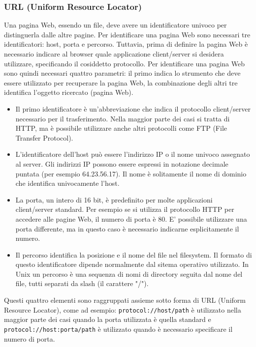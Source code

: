 \subsubsection*{URL (Uniform Resource Locator)}
Una pagina Web, essendo un file, deve avere un identificatore univoco per distinguerla dalle altre pagine. Per identificare una pagina Web sono necessari tre identificatori: host, porta e percorso. Tuttavia, prima di definire la pagina Web è necessario indicare al browser quale applicazione client/server si desidera utilizzare, specificando il cosiddetto protocollo. Per identificare una pagina Web sono quindi necessari quattro parametri: il primo indica lo strumento che deve essere utilizzato per recuperare la pagina Web, la combinazione degli altri tre identifica l'oggetto ricercato (pagina Web).
\begin{itemize}
    \item Il primo identificatore è un'abbreviazione che indica il protocollo client/server necessario per il trasferimento. Nella maggior parte dei casi si tratta di HTTP, ma è possibile utilizzare anche altri protocolli come FTP (File Transfer Protocol).
    \item L'identificatore dell'host può essere l'indirizzo IP o il nome univoco assegnato al server. Gli indirizzi IP possono essere espressi in notazione decimale puntata (per esempio 64.23.56.17). Il nome è solitamente il nome di dominio che identifica univocamente l'host.
    \item La porta, un intero di 16 bit, è predefinito per molte applicazioni client/server standard. Per esempio se si utilizza il protocollo HTTP per accedere alle pagine Web, il numero di porta è 80. E' possibile utilizzare una porta differente, ma in questo caso è necessario indicarne esplicitamente il numero.
    \item Il percorso identifica la posizione e il nome del file nel filesystem. Il formato di questo identificatore dipende normalmente dal sitema operativo utilizzato. In Unix un percorso è una sequenza di nomi di directory seguita dal nome del file, tutti separati da slash (il carattere "/").
\end{itemize}

Questi quattro elementi sono raggruppati assieme sotto forma di URL (Uniform Resource Locator), come ad esempio: \verb|protocol://host/path| è utilizzato nella maggior parte dei casi quando la porta utilizzata è quella standard e \verb|protocol://host:porta/path| è utilizzato quando è necessario specificare il numero di porta.

